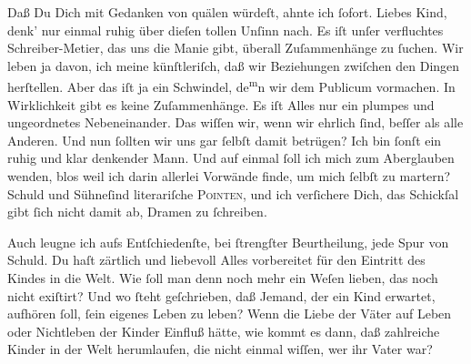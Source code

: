 \pstart
           Daß Du Dich mit Gedanken von \label{K_L02827-1v}\label{K_L02827-1} quälen würdeſt, ahnte ich{ }ſofort. Liebes Kind, denk’ nur einmal ruhig über
               dieſen tollen Unſinn nach. Es iſt unſer \strikeout{\textcolor{gray}{×}\-\textcolor{gray}{×}\-\textcolor{gray}{×}\-\textcolor{gray}{×}{ }\textcolor{gray}{×}\-\textcolor{gray}{×}\-\textcolor{gray}{×}\-\textcolor{gray}{×}\-\textcolor{gray}{×}\-\textcolor{gray}{×}{ }\textcolor{gray}{×}\-\textcolor{gray}{×}\-\textcolor{gray}{×}\-\textcolor{gray}{×}} verfluchtes Schreiber-{\pb}Metier, das uns die
               Manie gibt, überall Zuſammenhänge zu{ }ſuchen. Wir leben ja davon, ich meine
               künſtleriſch, daß wir Beziehungen zwiſchen den Dingen herſtellen. Aber das iſt ja ein
               Schwindel, de\substVorne{}\textsuperscript{m}\substDazwischen{}n\substHinten{} wir dem Publicum vormachen. In Wirklichkeit gibt es keine Zuſammenhänge. Es
               iſt Alles nur ein plumpes und ungeordnetes Nebeneinander. Das wiſſen wir, wenn wir
               ehrlich{ }ſind, beſſer als alle Anderen. Und nun{ }ſollten wir uns gar{ }ſelbſt damit
               betrügen? Ich bin{ }ſonſt ein ruhig und klar denkender Mann. Und auf einmal{ }ſoll ich
               mich zum Aber{\pb}glauben wenden, blos weil ich darin
               allerlei Vorwände finde\strikeout{\textcolor{gray}{n}}, um mich{ }ſelbſt zu martern? Schuld und Sühneſind literariſche \textsc{Pointen}, und
               ich verſichere Dich, das Schickſal gibt{ }ſich nicht damit ab, Dramen zu{ }ſchreiben.\pend
           
\pstart
           Auch leugne ich aufs Entſchiedenſte, bei{ }ſtrengſter Beurtheilung, jede Spur von
               Schuld. Du haſt zärtlich und liebevoll Alles vorbereitet für den Eintritt des Kindes in die Welt. Wie{ }ſoll
               man denn noch mehr ein Weſen lieben, das noch nicht exiſtirt? Und wo{ }ſteht
               geſchrieben, daß Jemand, der ein Kind erwartet, aufhören {\pb}ſoll,{ }ſein eigenes Leben zu leben? Wenn die Liebe
               der Väter auf Leben oder Nichtleben der Kinder Einfluß hätte, wie kommt es dann, daß
               zahlreiche Kinder in der Welt herumlaufen, die nicht einmal wiſſen, wer ihr Vater
                  war? {\dotsfive}\pend
           
